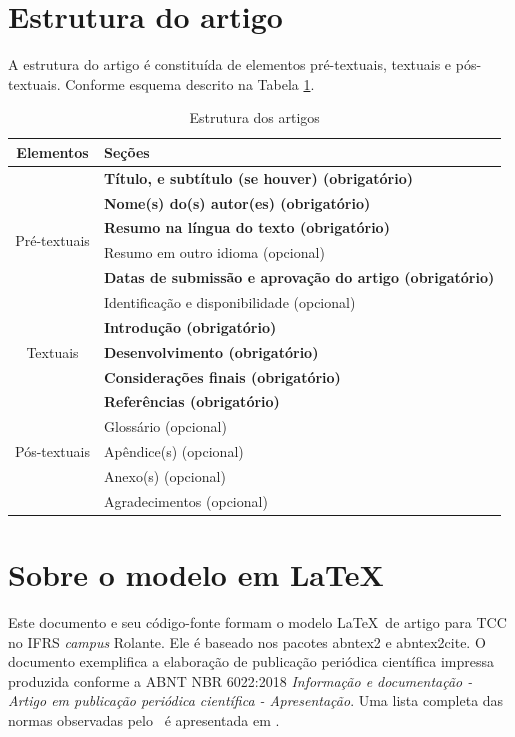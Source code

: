 \documentclass[
	article,			%
	12pt,				%
	oneside,			%
	a4paper,			%
	english,			%
	brazil,				%
	sumario=tradicional
]{abntex2}
\begin{document}
\section{Estrutura do artigo}

A estrutura do artigo é constituída de elementos pré-textuais, textuais e pós-textuais. Conforme esquema descrito na Tabela \ref{tbl1}.

\begin{table}[h]
	\centering
	\label{tbl1}
	\caption{Estrutura dos artigos}
	\begin{tabularx}{\textwidth}{cX} \toprule
		Elementos & Seções \\ \midrule
		\multirow{6}{*}{Pré-textuais} & \textbf{Título, e subtítulo (se houver) (obrigatório)} \\
		& \textbf{Nome(s) do(s) autor(es) (obrigatório)} \\ 
		& \textbf{Resumo na língua do texto (obrigatório)} \\
		& Resumo em outro idioma (opcional) \\
		& \textbf{Datas de submissão e aprovação do artigo (obrigatório)} \\
		& Identificação e disponibilidade (opcional) \\ \midrule
		\multirow{3}{*}{Textuais} & \textbf{Introdução (obrigatório)} \\ 
		& \textbf{Desenvolvimento (obrigatório)} \\ 
		& \textbf{Considerações finais (obrigatório)} \\ \midrule
		\multirow{5}{*}{Pós-textuais} & \textbf{Referências (obrigatório)} \\
		& Glossário (opcional) \\
		& Apêndice(s) (opcional) \\
		& Anexo(s) (opcional) \\
		& Agradecimentos (opcional)  \\ \bottomrule
	\end{tabularx} 
\end{table}

\section{Sobre o modelo em \LaTeX}

Este documento e seu código-fonte formam o modelo \LaTeX\ de artigo para TCC no IFRS \textit{campus} Rolante. Ele é baseado nos pacotes \textsf{abntex2} e \textsf{abntex2cite}. O documento exemplifica a elaboração de publicação periódica científica impressa produzida conforme a ABNT NBR 6022:2018 \emph{Informação e documentação - Artigo em publicação periódica científica - Apresentação}. Uma lista completa das normas observadas pelo \abnTeX\  é apresentada em .
\end{document}
